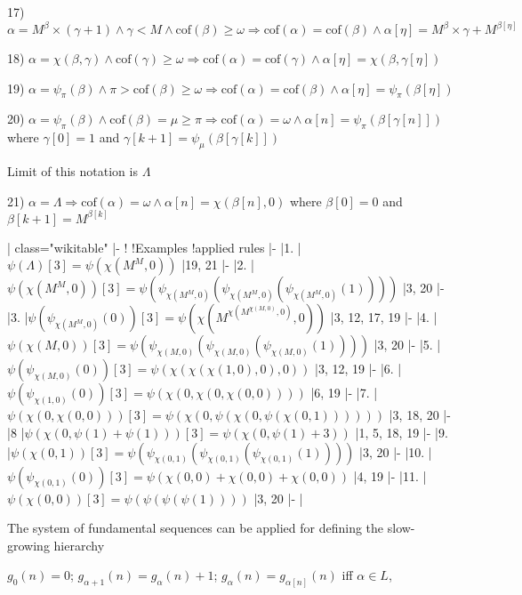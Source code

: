 \documentclass[10pt]{article}
\begin{document}
17) \(\alpha=M^\beta\times(\gamma+1) \wedge \gamma<M \wedge\text{cof}(\beta)\geq\omega \Rightarrow \text{cof}(\alpha)= \text{cof}(\beta) \wedge \alpha[\eta]=M^\beta\times\gamma+M^{\beta[\eta]}\)

\bigskip

18) \(\alpha=\chi(\beta,\gamma) \wedge \text{cof}(\gamma)\geq\omega \Rightarrow \text{cof} (\alpha)=\text{cof}(\gamma)\wedge \alpha[\eta]=\chi(\beta,\gamma[\eta])\)

19) \(\alpha=\psi_\pi(\beta) \wedge \pi>\text{cof}(\beta)\geq\omega \Rightarrow \text{cof} (\alpha)= \text{cof}(\beta) \wedge \alpha[\eta]=\psi_\pi(\beta[\eta])\)

20) \(\alpha=\psi_\pi(\beta) \wedge \text{cof}(\beta)=\mu\geq\pi \Rightarrow \text{cof} (\alpha)=\omega \wedge \alpha[n]=\psi _\pi(\beta[\gamma[n]])\) where  \(\gamma[0]=1\) and  \(\gamma[k+1]=\psi_\mu(\beta[\gamma[k]])\)

\bigskip

Limit of this notation is \(\Lambda\)

21) \(\alpha=\Lambda \Rightarrow \text{cof}(\alpha)=\omega \wedge \alpha[n]=\chi(\beta[n],0)\) where \(\beta[0]=0\) and  \(\beta[k+1]=M^{\beta[k]}\)

\bigskip

{| class="wikitable"
|-
!
!Examples
!applied rules
|-
|1.
|\(\psi(\Lambda)[3]=\psi(\chi(M^M,0))\)
|19, 21
|-
|2.
|\(\psi(\chi(M^M,0))[3]=\psi(\psi_{\chi(M^M,0)}(\psi_{\chi(M^M,0)}(\psi_{\chi(M^M,0)}(1))))\)
|3, 20
|-
|3.
|\(\psi(\psi_{\chi(M^M,0)}(0))[3]=\psi(\chi(M^{\chi(M^{\chi(M,0)},0)},0))\)
|3, 12, 17, 19
|-
|4.
|\(\psi(\chi(M,0))[3]=\psi(\psi_{\chi(M,0)}(\psi_{\chi(M,0)}(\psi_{\chi(M,0)}(1))))\)
|3, 20
|-
|5.
|\(\psi(\psi_{\chi(M,0)}(0))[3]=\psi(\chi(\chi(\chi(1,0),0),0))\)
|3, 12, 19
|-
|6.
|\(\psi(\psi_{\chi(1,0)}(0))[3]=\psi(\chi(0,\chi(0,\chi(0,0))))\)
|6, 19
|-
|7.
|\(\psi(\chi(0,\chi(0,0)))[3]=\psi(\chi(0,\psi(\chi(0,\psi(\chi(0,1))))))\)
|3, 18, 20
|-
|8
|\(\psi(\chi(0, \psi(1)+\psi(1)))[3]=\psi(\chi(0, \psi(1)+3))\)
|1, 5, 18, 19
|-
|9.
|\(\psi(\chi(0,1))[3]=\psi(\psi_{\chi(0,1)}(\psi_{\chi(0,1)}(\psi_{\chi(0,1)}(1))))\)
|3, 20
|-
|10.
|\(\psi(\psi_{\chi(0,1)}(0))[3]=\psi(\chi(0,0)+\chi(0,0)+\chi(0,0))\)
|4, 19
|-
|11.
|\(\psi(\chi(0,0))[3]=\psi(\psi(\psi(\psi(1))))\)
|3, 20
|-
|}

\bigskip

The system of fundamental sequences can be applied for defining the slow-growing hierarchy

\(g_0(n)=0\);  \(g_{\alpha+1}(n)=g_\alpha(n)+1\);  \(g_\alpha(n)=g_{\alpha[n]}(n)\) iff \(\alpha\in L\),
\end{document}
